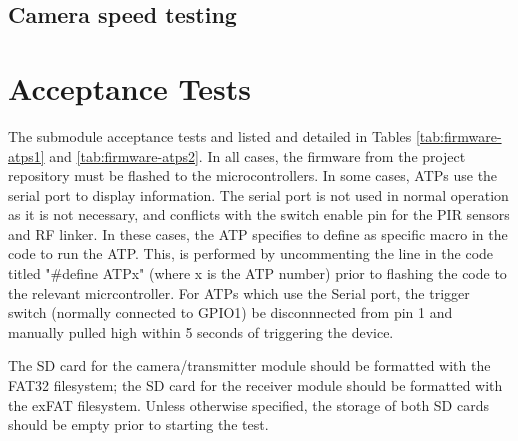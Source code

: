 

\subsection{Camera speed testing}


\section{Acceptance Tests \label{s:firmware-atps}}

The submodule acceptance tests and listed and detailed in Tables \ref{tab:firmware-atps1} and \ref{tab:firmware-atps2}. In all cases, the firmware from the project repository must be flashed to the microcontrollers. In some cases, ATPs use the serial port to display information. The serial port is not used in normal operation as it is not necessary, and conflicts with the switch enable pin for the PIR sensors and RF linker.  In these cases, the ATP specifies to define as specific macro in the code to run the ATP. This, is performed by uncommenting the line in the code titled "\#define ATPx" (where x is the ATP number) prior to flashing the code to the relevant micrcontroller. For ATPs which use the Serial port, the trigger switch (normally connected to GPIO1) be disconnnected from pin 1 and manually pulled high within 5 seconds of triggering the device.

The SD card for the camera/transmitter module should be formatted with the FAT32 filesystem; the SD card for the receiver module should be formatted with the exFAT filesystem. Unless otherwise specified, the storage of both SD cards should be empty prior to starting the test.

